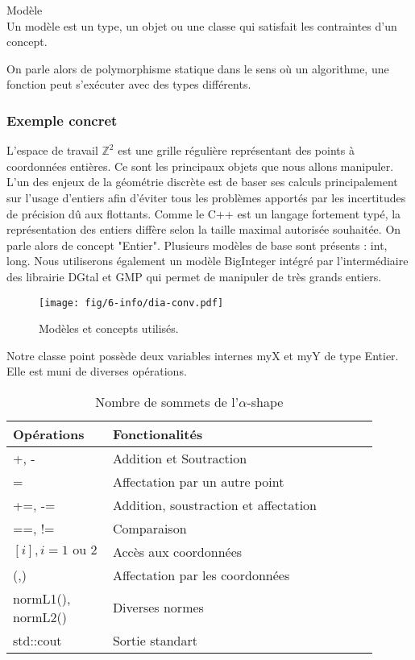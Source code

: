 \begin{Definition}{Modèle}\\
  Un modèle est un type, un objet ou une classe qui satisfait les contraintes d'un concept.
\label{def:cpp-mod}

\end{Definition}

On parle alors de polymorphisme statique dans le sens où un algorithme, une fonction peut s'exécuter avec des types différents.

\subsubsection{Exemple concret}

L'espace de travail $\mathbb{Z}^{2}$ est une grille régulière représentant des points à coordonnées entières. Ce sont les principaux objets que nous allons manipuler. L'un des enjeux de la géométrie discrète est de baser ses calculs principalement sur l'usage d'entiers afin d'éviter tous les problèmes apportés par les incertitudes de précision dû aux flottants. Comme le C++ est un langage fortement typé, la représentation des entiers diffère selon la taille maximal autorisée souhaitée. On parle alors de concept "Entier". Plusieurs modèles de base sont présents : int, long. Nous utiliserons également un modèle BigInteger intégré par l'intermédiaire des librairie DGtal et GMP qui permet de manipuler de très grands entiers.

\begin{figure}[H]
  \centering
  \texttt{[image: fig/6-info/dia-conv.pdf]}
  \caption{Modèles et concepts utilisés.}
\end{figure}

Notre classe point possède deux variables internes myX et myY de type Entier. Elle est muni de diverses opérations.

\begin{table}[H]
  \begin{tabular}{|p{0.2\linewidth}|p{0.7\linewidth}|}
    \hline
     Opérations & Fonctionalités\\ 
    \hline
    +, -               & Addition et Soutraction\\
    =                  & Affectation par un autre point\\
    +=, -=             & Addition, soustraction et affectation\\
    ==, !=             & Comparaison\\
    $[i], i = 1 \text{ ou } 2$     & Accès aux coordonnées\\
    (,)                & Affectation par les coordonnées\\
    normL1(), normL2() & Diverses normes\\
    std::cout          & Sortie standart\\
    \hline
  \end{tabular} 
  \caption{Nombre de sommets de l'$\alpha$-shape}
\end{table}

